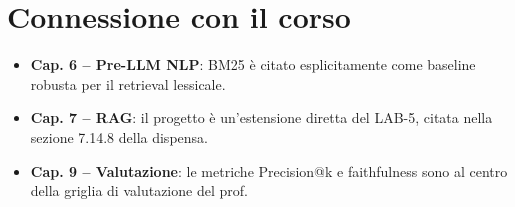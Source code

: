 \documentclass[12pt,a4paper]{article}
\begin{document}
\section{Connessione con il corso}

\begin{itemize}
  \item \textbf{Cap. 6 -- Pre-LLM NLP}: BM25 \`e citato esplicitamente come baseline robusta per il retrieval lessicale.
  \item \textbf{Cap. 7 -- RAG}: il progetto \`e un'estensione diretta del LAB-5, citata nella sezione 7.14.8 della dispensa.
  \item \textbf{Cap. 9 -- Valutazione}: le metriche Precision@k e faithfulness sono al centro della griglia di valutazione del prof.
\end{itemize}
\end{document}
